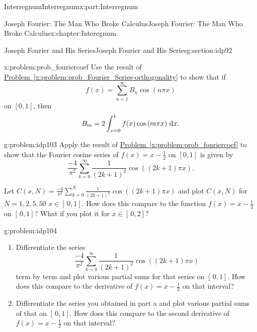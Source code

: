 \begin{partptx}{Interregnum}{}{Interregnum}{}{}{x:part:Interregnum}
\begin{chapterptx}{Joseph Fourier: The Man Who Broke Calculus}{}{Joseph Fourier: The Man Who Broke Calculus}{}{}{x:chapter:Interegnum}
\begin{sectionptx}{Joseph Fourier and His Series}{}{Joseph Fourier and His Series}{}{}{g:section:idp92}
\begin{problem}{}{x:problem:prob_fouriercoef}
				 Use the result of \hyperref[x:problem:prob_Fourier_Series-orthogonality]{Problem~{\xreffont\ref{x:problem:prob_Fourier_Series-orthogonality}}} to show that if%
				\begin{equation*}
					f(x)=\sum_{n=1}^\infty B_n\cos\left(n\pi x\right)
				\end{equation*}
				on \([0,1]\), then%
				\begin{equation*}
					B_m=2\int_{x=0}^1f(x)\cos\left(m\pi x\right)\,{\rm d} x.{}
				\end{equation*}
			\end{problem}
			\begin{problem}{}{g:problem:idp103}%
				 Apply the result of \hyperref[x:problem:prob_fouriercoef]{Problem~{\xreffont\ref{x:problem:prob_fouriercoef}}} to show that the Fourier cosine series of \(f(x)=x-\frac{1}{2}\) on \([0,1]\) is given by%
				\begin{equation*}
					\frac{-4}{\pi^2}\sum_{k=0}^\infty\frac{1}{\left(2k+1\right)^2}\cos \left((2k+1)\pi x\right)\text{.}
				\end{equation*}
				\par
				Let \(C(x,N)=\frac{-4}{\pi^2}\sum_{k=0}^N\frac{1}{\left(2k+1\right)^2}\cos \left((2k+1)\pi x\right)\) and plot \(C(x,N)\) for \(N=1,2,5,50\) \(x\in[\,0,1]\). How does this compare to the function \(f(x)=x-\frac{1}{2}\) on \([\,0,1]\)? What if you plot it for \(x\in[\,0,2]?\)%
			\end{problem}
			\begin{problem}{}{g:problem:idp104}%
				\begin{enumerate}[font=\bfseries,label=(\alph*),ref=\alph*]
					\item{}Differentiate the series%
					\begin{equation*}
						\frac{-4}{\pi^2}\sum_{k=0}^\infty\frac{1}{\left(2k+1\right)^2}\cos \left((2k+1)\pi x\right)
					\end{equation*}
					term by term and plot various partial sums for that series on \([\,0,1]\). How does this compare to the derivative of \(f(x)=x-\frac{1}{2}\) on that interval?%
					\item{}Differentiate the series you obtained in part a and plot various partial sums of that on \([\,0,1]\). How does this compare to the second derivative of \(f(x)=x-\frac{1}{2}\) on that interval?%
				\end{enumerate}
			\end{problem}
		\end{sectionptx}
	\end{chapterptx}
\end{partptx}
%
%